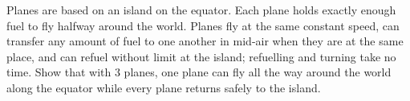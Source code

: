 Planes are based on an island on the equator. Each plane holds exactly enough fuel to fly halfway around the world. Planes fly at the same constant speed, can transfer any amount of fuel to one another in mid-air when they are at the same place, and can refuel without limit at the island; refuelling and turning take no time. Show that with $3$ planes, one plane can fly all the way around the world along the equator while every plane returns safely to the island.
